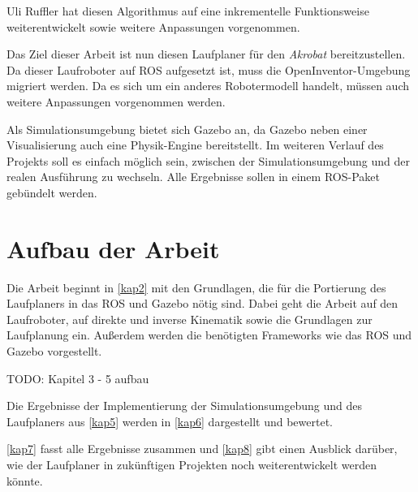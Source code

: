 Uli Ruffler \autocite{ruffler2006} hat diesen Algorithmus auf eine inkrementelle Funktionsweise weiterentwickelt sowie weitere Anpassungen vorgenommen.

Das Ziel dieser Arbeit ist nun diesen Laufplaner für den \emph{Akrobat} bereitzustellen. Da dieser Laufroboter auf \ac{ROS} aufgesetzt ist, muss die OpenInventor-Umgebung migriert werden. Da es sich um ein anderes Robotermodell handelt, müssen auch weitere Anpassungen vorgenommen werden.

Als Simulationsumgebung bietet sich Gazebo an, da Gazebo neben einer Visualisierung auch eine Physik-Engine bereitstellt. Im weiteren Verlauf des Projekts soll es einfach möglich sein, zwischen der Simulationsumgebung und der realen Ausführung zu wechseln. Alle Ergebnisse sollen in einem \ac{ROS}-Paket gebündelt werden.

\section{Aufbau der Arbeit}

Die Arbeit beginnt in \autoref{kap2} mit den Grundlagen, die für die Portierung des Laufplaners in das \ac{ROS} und Gazebo nötig sind. Dabei geht die Arbeit auf den Laufroboter, auf direkte und inverse Kinematik sowie die Grundlagen zur Laufplanung ein. Außerdem werden die benötigten Frameworks wie das \ac{ROS} und Gazebo vorgestellt.

TODO: Kapitel 3 - 5 aufbau

Die Ergebnisse der Implementierung der Simulationsumgebung und des Laufplaners aus \autoref{kap5} werden in \autoref{kap6} dargestellt und bewertet.

\autoref{kap7} fasst alle Ergebnisse zusammen und \autoref{kap8} gibt einen Ausblick darüber, wie der Laufplaner in zukünftigen Projekten noch weiterentwickelt werden könnte.